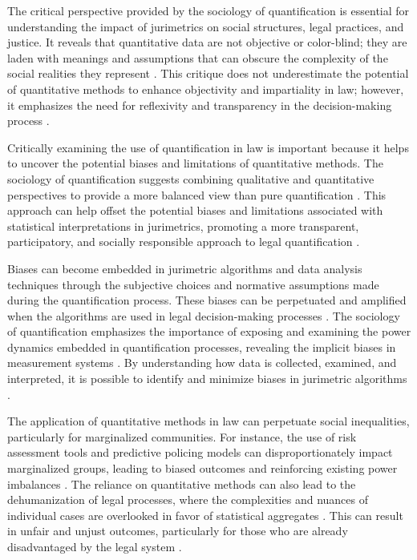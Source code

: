 The critical perspective provided by the sociology of quantification is essential for understanding the impact of jurimetrics on social structures, legal practices, and justice. It reveals that quantitative data are not objective or color-blind; they are laden with meanings and assumptions that can obscure the complexity of the social realities they represent \cite{10.1057/s41599-020-00557-0, de2010jurimetrics}. This critique does not underestimate the potential of quantitative methods to enhance objectivity and impartiality in law; however, it emphasizes the need for reflexivity and transparency in the decision-making process \cite{10.1057/s41599-020-00557-0, de2010jurimetrics}.

Critically examining the use of quantification in law is important because it helps to uncover the potential biases and limitations of quantitative methods. The sociology of quantification suggests combining qualitative and quantitative perspectives to provide a more balanced view than pure quantification \cite{10.1057/s41599-020-00557-0, de2010jurimetrics}. This approach can help offset the potential biases and limitations associated with statistical interpretations in jurimetrics, promoting a more transparent, participatory, and socially responsible approach to legal quantification \cite{10.1057/s41599-020-00557-0, de2010jurimetrics}.

Biases can become embedded in jurimetric algorithms and data analysis techniques through the subjective choices and normative assumptions made during the quantification process. These biases can be perpetuated and amplified when the algorithms are used in legal decision-making processes \cite{10.1590/dados.2022.65.3.267,10.1007/978-3-319-44000-215}. The sociology of quantification emphasizes the importance of exposing and examining the power dynamics embedded in quantification processes, revealing the implicit biases in measurement systems \cite{10.1057/s41599-020-00557-0,10.1080/07329113.2015.1046739}. By understanding how data is collected, examined, and interpreted, it is possible to identify and minimize biases in jurimetric algorithms \cite{10.1590/dados.2022.65.3.267,10.1007/978-3-319-44000-215}.

The application of quantitative methods in law can perpetuate social inequalities, particularly for marginalized communities. For instance, the use of risk assessment tools and predictive policing models can disproportionately impact marginalized groups, leading to biased outcomes and reinforcing existing power imbalances \cite{10.1057/s41599-020-00557-0}. The reliance on quantitative methods can also lead to the dehumanization of legal processes, where the complexities and nuances of individual cases are overlooked in favor of statistical aggregates \cite{10.1057/s41599-020-00557-0}. This can result in unfair and unjust outcomes, particularly for those who are already disadvantaged by the legal system \cite{10.1057/s41599-020-00557-0}.

